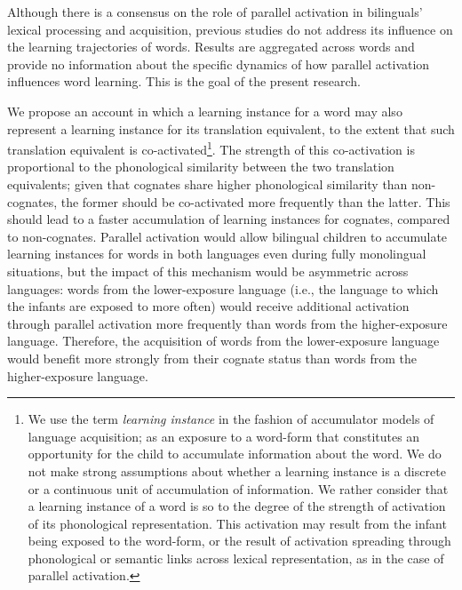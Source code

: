 \documentclass[
]{article}
\begin{document}
Although there is a consensus on the role of parallel activation in
bilinguals' lexical processing and acquisition, previous studies do not
address its influence on the learning trajectories of words. Results are
aggregated across words and provide no information about the specific
dynamics of how parallel activation influences word learning. This is
the goal of the present research.

We propose an account in which a learning instance for a word may also
represent a learning instance for its translation equivalent, to the
extent that such translation equivalent is co-activated\footnote{We use
  the term \emph{learning instance} in the fashion of accumulator models
  of language acquisition; as an exposure to a word-form that
  constitutes an opportunity for the child to accumulate information
  about the word. We do not make strong assumptions about whether a
  learning instance is a discrete or a continuous unit of accumulation
  of information. We rather consider that a learning instance of a word
  is so to the degree of the strength of activation of its phonological
  representation. This activation may result from the infant being
  exposed to the word-form, or the result of activation spreading
  through phonological or semantic links across lexical representation,
  as in the case of parallel activation.}. The strength of this
co-activation is proportional to the phonological similarity between the
two translation equivalents; given that cognates share higher
phonological similarity than non-cognates, the former should be
co-activated more frequently than the latter. This should lead to a
faster accumulation of learning instances for cognates, compared to
non-cognates. Parallel activation would allow bilingual children to
accumulate learning instances for words in both languages even during
fully monolingual situations, but the impact of this mechanism would be
asymmetric across languages: words from the lower-exposure language
(i.e., the language to which the infants are exposed to more often)
would receive additional activation through parallel activation more
frequently than words from the higher-exposure language. Therefore, the
acquisition of words from the lower-exposure language would benefit more
strongly from their cognate status than words from the higher-exposure
language.
\end{document}
